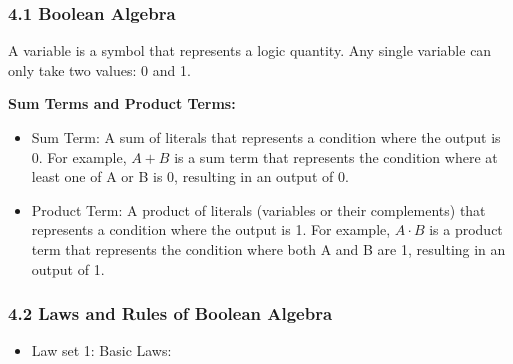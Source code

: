 \documentclass[
  a4paper,
]{article}
\providecommand{\tightlist}{%
  \setlength{\itemsep}{0pt}\setlength{\parskip}{0pt}}
\begin{document}
\subsubsection{4.1 Boolean Algebra}\label{boolean-algebra}

A variable is a symbol that represents a logic quantity. Any single
variable can only take two values: 0 and 1.

\textbf{Sum Terms and Product Terms:}

\begin{itemize}
\tightlist
\item
  Sum Term: A sum of literals that represents a condition where the
  output is 0. For example, \(A + B\) is a sum term that represents the
  condition where at least one of A or B is 0, resulting in an output of
  0.
\item
  Product Term: A product of literals (variables or their complements)
  that represents a condition where the output is 1. For example,
  \(A \cdot B\) is a product term that represents the condition where
  both A and B are 1, resulting in an output of 1.
\end{itemize}

\subsubsection{4.2 Laws and Rules of Boolean
Algebra}\label{laws-and-rules-of-boolean-algebra}

\begin{itemize}
\tightlist
\item
  Law set 1: Basic Laws:
\end{itemize}
\end{document}

